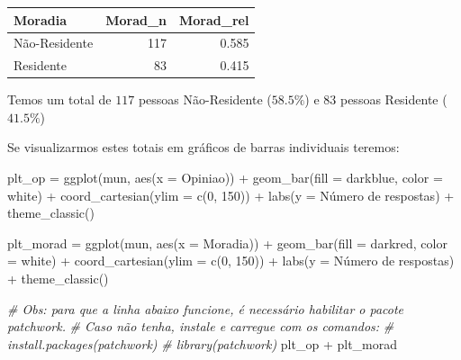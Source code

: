 \documentclass[
]{book}
\newenvironment{Shaded}{\begin{snugshade}}{\end{snugshade}}
\newcommand{\AttributeTok}[1]{\textcolor[rgb]{0.77,0.63,0.00}{#1}}
\newcommand{\CommentTok}[1]{\textcolor[rgb]{0.56,0.35,0.01}{\textit{#1}}}
\newcommand{\DecValTok}[1]{\textcolor[rgb]{0.00,0.00,0.81}{#1}}
\newcommand{\FunctionTok}[1]{\textcolor[rgb]{0.00,0.00,0.00}{#1}}
\newcommand{\NormalTok}[1]{#1}
\newcommand{\OtherTok}[1]{\textcolor[rgb]{0.56,0.35,0.01}{#1}}
\newcommand{\SpecialCharTok}[1]{\textcolor[rgb]{0.00,0.00,0.00}{#1}}
\newcommand{\StringTok}[1]{\textcolor[rgb]{0.31,0.60,0.02}{#1}}
\begin{document}
\begin{tabular}{l|r|r}
\hline
Moradia & Morad\_n & Morad\_rel\\
\hline
Não-Residente & 117 & 0.585\\
\hline
Residente & 83 & 0.415\\
\hline
\end{tabular}

Temos um total de \(117\) pessoas Não-Residente (\(58.5\%\)) e \(83\) pessoas Residente (\(41.5\%\))

Se visualizarmos estes totais em gráficos de barras individuais teremos:

\begin{Shaded}
\begin{Highlighting}[]
\NormalTok{plt\_op }\OtherTok{=} \FunctionTok{ggplot}\NormalTok{(mun, }\FunctionTok{aes}\NormalTok{(}\AttributeTok{x =}\NormalTok{ Opiniao)) }\SpecialCharTok{+}
  \FunctionTok{geom\_bar}\NormalTok{(}\AttributeTok{fill =} \StringTok{\textquotesingle{}darkblue\textquotesingle{}}\NormalTok{, }\AttributeTok{color =} \StringTok{\textquotesingle{}white\textquotesingle{}}\NormalTok{) }\SpecialCharTok{+}
  \FunctionTok{coord\_cartesian}\NormalTok{(}\AttributeTok{ylim =} \FunctionTok{c}\NormalTok{(}\DecValTok{0}\NormalTok{, }\DecValTok{150}\NormalTok{)) }\SpecialCharTok{+}
  \FunctionTok{labs}\NormalTok{(}\AttributeTok{y =} \StringTok{\textquotesingle{}Número de respostas\textquotesingle{}}\NormalTok{) }\SpecialCharTok{+}
  \FunctionTok{theme\_classic}\NormalTok{()}

\NormalTok{plt\_morad }\OtherTok{=} \FunctionTok{ggplot}\NormalTok{(mun, }\FunctionTok{aes}\NormalTok{(}\AttributeTok{x =}\NormalTok{ Moradia)) }\SpecialCharTok{+}
  \FunctionTok{geom\_bar}\NormalTok{(}\AttributeTok{fill =} \StringTok{\textquotesingle{}darkred\textquotesingle{}}\NormalTok{, }\AttributeTok{color =} \StringTok{\textquotesingle{}white\textquotesingle{}}\NormalTok{) }\SpecialCharTok{+}
  \FunctionTok{coord\_cartesian}\NormalTok{(}\AttributeTok{ylim =} \FunctionTok{c}\NormalTok{(}\DecValTok{0}\NormalTok{, }\DecValTok{150}\NormalTok{)) }\SpecialCharTok{+}
  \FunctionTok{labs}\NormalTok{(}\AttributeTok{y =} \StringTok{\textquotesingle{}Número de respostas\textquotesingle{}}\NormalTok{) }\SpecialCharTok{+}
  \FunctionTok{theme\_classic}\NormalTok{()}

\CommentTok{\# Obs: para que a linha abaixo funcione, é necessário habilitar o pacote \textquotesingle{}patchwork\textquotesingle{}. }
\CommentTok{\# Caso não tenha, instale e carregue com os comandos:}
\CommentTok{\# install.packages(\textquotesingle{}patchwork\textquotesingle{})}
\CommentTok{\# library(patchwork)}
\NormalTok{plt\_op }\SpecialCharTok{+}\NormalTok{ plt\_morad}
\end{Highlighting}
\end{Shaded}
\end{document}
